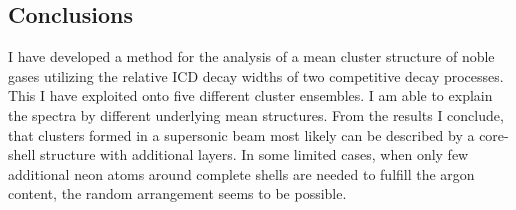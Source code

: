 \subsection{Conclusions}
I have developed a method for the analysis of a mean cluster
structure of noble gases utilizing the relative ICD decay widths
of two competitive decay processes. This I have exploited onto
five different cluster ensembles. I am able to explain the
spectra by different underlying mean structures. From the results I conclude, that
clusters formed in a supersonic beam most likely can be described
by a core-shell structure with additional layers. In some limited cases,
when only few additional neon atoms around complete shells are needed
to fulfill the argon content, the random arrangement seems to be possible.\\
